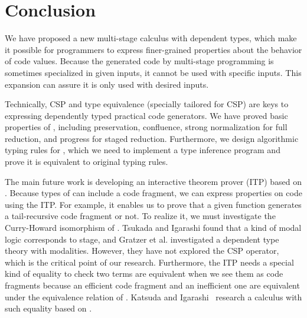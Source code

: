 
\section{Conclusion \label{sec:conclusion}}


We have proposed a new multi-stage calculus \LMD with dependent types, which make it possible for programmers to express finer-grained properties about the behavior of code values. Because the generated code by multi-stage programming is sometimes specialized in given inputs, it cannot be used with specific inputs. This expansion can assure it is only used with desired inputs.


Technically, CSP and type equivalence (specially tailored for CSP) are keys to expressing dependently typed practical code generators.  We have proved basic properties of \LMD, including preservation, confluence, strong normalization for full reduction, and progress for staged reduction. Furthermore, we design algorithmic typing rules for \LMD, which we need to implement a type inference program and prove it is equivalent to original typing rules.


The main future work is developing an interactive theorem prover (ITP) based on \LMD. Because types of \LMD can include a code fragment, we can express properties on code using the ITP. For example, it enables us to prove that a given function generates a tail-recursive code fragment or not. To realize it, we must investigate the Curry-Howard isomorphism of \LMD. Tsukada and Igarashi \cite{TsukadaIgarashi2010Logical} found that a kind of modal logic corresponds to stage, and Gratzer et al. \cite{GratzerSterlingBirkedal2019ModalDependent} investigated a dependent type theory with modalities. However, they have not explored the CSP operator, which is the critical point of our research. Furthermore, the ITP needs a special kind of equality to check two terms are equivalent when we see them as code fragments because an efficient code fragment and an inefficient one are equivalent under the equivalence relation of \LMD. Katsuda and Igarashi~\cite{KatsudaIgarashi2020} research a calculus with such equality based on \LMD.
